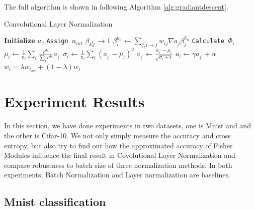 \documentclass{sig-alternate}
\begin{document}
    The full algorithm is shown in following Algorithm \ref{alg:gradiantdescent}.

    \begin{algorithm}
        \caption{Convolutional Layer Normalization}\label{alg:gradiantdescent}
        \begin {algorithmic}[1]
            \STATE \textbf{Initialize} $w_l$
            \STATE \texttt{Assign $n_{int}$}
            \STATE $\beta_k_n^{k_n} \rightarrow 1$
                \STATE \texttt{$\beta_{i}^{k_n} \leftarrow \sum_{j, i\rightarrow j}w_{ij}\nabla a_j \beta_j^{k_n}$}
                \STATE \texttt{Calculate $\Phi_{i}$}
            \ENDFOR
            \STATE \texttt{$\mu_l \leftarrow \frac{1}{n_{l}}\sum_i \frac{e^{\Phi_i}}{\sum_i e^{\Phi_i}}a_{i^{'}}$}
            \STATE \texttt{$\sigma_l \leftarrow \frac{1}{n_l}\sum_i (a_{i^{'}}-\mu_l)^{2}$}
            \STATE \texttt{$a_{i^{'}}\leftarrow \frac{a_{i^{'}}-\mu_l}{\sqrt{\sigma_l+\epsilon}}$}
            \STATE \texttt{$a_l \leftarrow \gamma a_{i^{'}} + \alpha$}
                \STATE \texttt{$w_l = \lambda w_{l_{old}} + (1-\lambda)w_l$}
            \ENDWHILE
            
        \end{algorithmic}
        
    \end{algorithm}

\section{Experiment Results}
    In this section, we have done experiments in two datasets, one is Mnist and and the other is Cifar-10. We not only simply measure the accuracy and cross entropy, but also try to find out how the approximated accuracy of Fisher Modules influence the final result in Covolutional Layer Normalization and compare robustness to batch size of three normalization methods. In both experiments, Batch Normalization and Layer normalization are baselines. 
    \subsection{Mnist classification}
    
\end{document}
